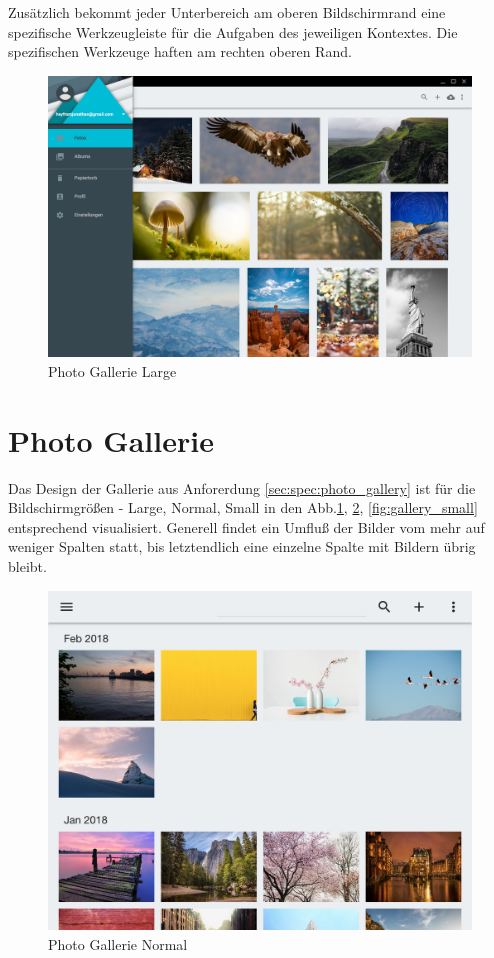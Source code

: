 Zusätzlich bekommt jeder Unterbereich am oberen Bildschirmrand eine spezifische Werkzeugleiste für die Aufgaben des jeweiligen Kontextes. Die spezifischen Werkzeuge haften am rechten oberen Rand.

\begin{figure}[htp]     %
\centering
\includegraphics[width=1.0\textwidth]{images/gallery_large} 
\caption{Photo Gallerie Large}\label{fig:gallery_large}
\end{figure}

\section{Photo Gallerie}

Das Design der Gallerie aus Anforerdung \ref{sec:spec:photo_gallery} ist für die Bildschirmgrößen - Large, Normal, Small in den Abb.\ref{fig:gallery_large}, \ref{fig:gallery_normal}, \ref{fig:gallery_small} entsprechend visualisiert.
Generell findet ein Umfluß der Bilder vom mehr auf weniger Spalten statt, bis letztendlich eine einzelne Spalte mit Bildern übrig bleibt.

\begin{figure}[htp]     %
\centering
\includegraphics[width=1.0\textwidth]{images/gallery_normal} 
\caption{Photo Gallerie Normal}\label{fig:gallery_normal}
\end{figure}

